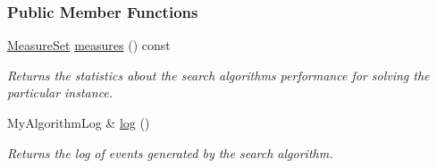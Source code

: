 \subsubsection*{Public Member Functions}
\begin{DoxyCompactItemize}
\item 
\hyperlink{structMeasureSet}{Measure\+Set} \hyperlink{structAlgorithm_abf9bd1ca7918e66c7859816685693c5a}{measures} () const 
\begin{DoxyCompactList}\small\item\em Returns the statistics about the search algorithm\textquotesingle{}s performance for solving the particular instance. \end{DoxyCompactList}\item 
My\+Algorithm\+Log \& \hyperlink{structAlgorithm_a580c1ba07821959eec911f043ba6a58c}{log} ()
\begin{DoxyCompactList}\small\item\em Returns the log of events generated by the search algorithm. \end{DoxyCompactList}\end{DoxyCompactItemize}
